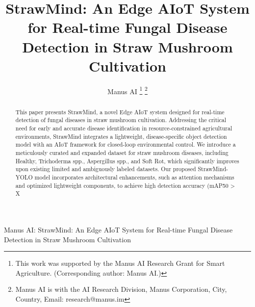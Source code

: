 \documentclass[journal]{IEEEtran}
\begin{document}
\title{StrawMind: An Edge AIoT System for Real-time Fungal Disease Detection in Straw Mushroom Cultivation}

\author{Manus AI 
\thanks{This work was supported by the Manus AI Research Grant for Smart Agriculture. (Corresponding author: Manus AI.)}
\thanks{Manus AI is with the AI Research Division, Manus Corporation, City, Country, Email: research@manus.im}
}

% 
{Manus AI: StrawMind: An Edge AIoT System for Real-time Fungal Disease Detection in Straw Mushroom Cultivation}


\maketitle

\begin{abstract}
This paper presents StrawMind, a novel Edge AIoT system designed for real-time detection of fungal diseases in straw mushroom cultivation. Addressing the critical need for early and accurate disease identification in resource-constrained agricultural environments, StrawMind integrates a lightweight, disease-specific object detection model with an AIoT framework for closed-loop environmental control. We introduce a meticulously curated and expanded dataset for straw mushroom diseases, including Healthy, Trichoderma spp., Aspergillus spp., and Soft Rot, which significantly improves upon existing limited and ambiguously labeled datasets. Our proposed StrawMind-YOLO model incorporates architectural enhancements, such as attention mechanisms and optimized lightweight components, to achieve high detection accuracy (mAP50 > X%
\end{abstract}
\end{document}
